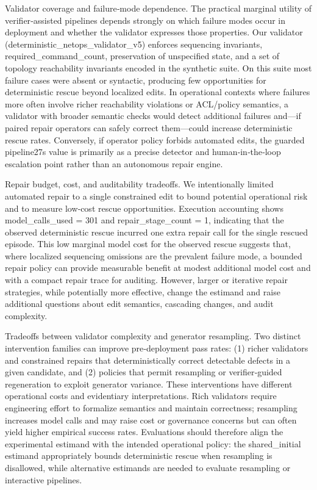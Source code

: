 \documentclass[conference]{IEEEtran}
\begin{document}
Validator coverage and failure‑mode dependence. The practical marginal utility of verifier‑assisted pipelines depends strongly on which failure modes occur in deployment and whether the validator expresses those properties. Our validator (deterministic\_netops\_validator\_v5) enforces sequencing invariants, required\_command\_count, preservation of unspecified state, and a set of topology reachability invariants encoded in the synthetic suite. On this suite most failure cases were absent or syntactic, producing few opportunities for deterministic rescue beyond localized edits. In operational contexts where failures more often involve richer reachability violations or ACL/policy semantics, a validator with broader semantic checks would detect additional failures and---if paired repair operators can safely correct them---could increase deterministic rescue rates. Conversely, if operator policy forbids automated edits, the guarded pipeline 27s value is primarily as a precise detector and human‑in‑the‑loop escalation point rather than an autonomous repair engine.

Repair budget, cost, and auditability tradeoffs. We intentionally limited automated repair to a single constrained edit to bound potential operational risk and to measure low‑cost rescue opportunities. Execution accounting shows model\_calls\_used = 301 and repair\_stage\_count = 1, indicating that the observed deterministic rescue incurred one extra repair call for the single rescued episode. This low marginal model cost for the observed rescue suggests that, where localized sequencing omissions are the prevalent failure mode, a bounded repair policy can provide measurable benefit at modest additional model cost and with a compact repair trace for auditing. However, larger or iterative repair strategies, while potentially more effective, change the estimand and raise additional questions about edit semantics, cascading changes, and audit complexity.

Tradeoffs between validator complexity and generator resampling. Two distinct intervention families can improve pre‑deployment pass rates: (1) richer validators and constrained repairs that deterministically correct detectable defects in a given candidate, and (2) policies that permit resampling or verifier‑guided regeneration to exploit generator variance. These interventions have different operational costs and evidentiary interpretations. Rich validators require engineering effort to formalize semantics and maintain correctness; resampling increases model calls and may raise cost or governance concerns but can often yield higher empirical success rates. Evaluations should therefore align the experimental estimand with the intended operational policy: the shared\_initial estimand appropriately bounds deterministic rescue when resampling is disallowed, while alternative estimands are needed to evaluate resampling or interactive pipelines.
\end{document}
